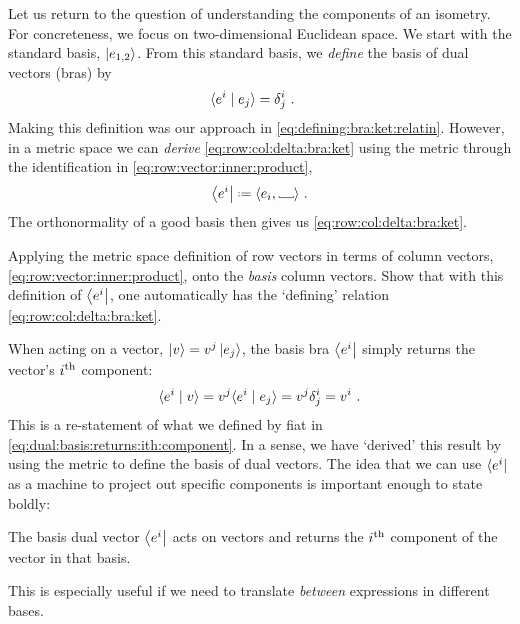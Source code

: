 \documentclass[12pt, oneside]{report}    %
\begin{document}
Let us return to the question of understanding the components of an isometry. For concreteness, we focus on two-dimensional Euclidean space. We start with the standard basis, $\left|e_{1,2}\right\rangle$. From this standard basis, we \emph{define} the basis of dual vectors (bras) by
\begin{align}
    \langle e^i \mid e_j \rangle &= \delta^i_j \ .
    \label{eq:row:col:delta:bra:ket}
\end{align}
Making this definition was our approach in \eqref{eq:defining:bra:ket:relatin}. However, in a metric space we can \emph{derive} \eqref{eq:row:col:delta:bra:ket} using the metric through the identification in \eqref{eq:row:vector:inner:product},
\begin{align}
    \bra{e^i} \defeq \la e_i , \Vtextvisiblespace[1em]{} \ra \ .
    \label{eq:basis:dual:vectors:as:inner:prod}
\end{align}
The orthonormality of a good basis then gives us \eqref{eq:row:col:delta:bra:ket}.
\begin{exercise}
Applying the metric space definition of row vectors in terms of column vectors, \eqref{eq:row:vector:inner:product}, onto the \emph{basis} column vectors. Show that with this definition of $\left\langle e^i\right|$, one automatically has the `defining' relation \eqref{eq:row:col:delta:bra:ket}.
\end{exercise}

When acting on a vector, $\left|v\right\rangle = v^j \left|e_j\right\rangle$, the basis bra $\left\langle e^i\right|$ simply returns the vector's $i^\textnormal{th}$ component:
\begin{align}
    \langle e^i \mid v \rangle = v^j \langle e^i \mid e_j \rangle = v^j \delta^i_j = v^i \ .
    \label{eq:dual:basis:returns:ith:component:ket}
\end{align}
This is a re-statement of what we defined by fiat in \eqref{eq:dual:basis:returns:ith:component}. In a sense, we have `derived' this result by using the metric to define the basis of dual vectors. The idea that we can use $\langle e^i |$ as a machine to project out specific components is important enough to state boldly:
\begin{bigidea}
The basis dual vector $\left\langle e^i\right|$ acts on vectors and returns the $i^\textnormal{th}$ component of the vector in that basis. 
\end{bigidea}
This is especially useful if we need to translate \emph{between} expressions in different bases. 
\end{document}
